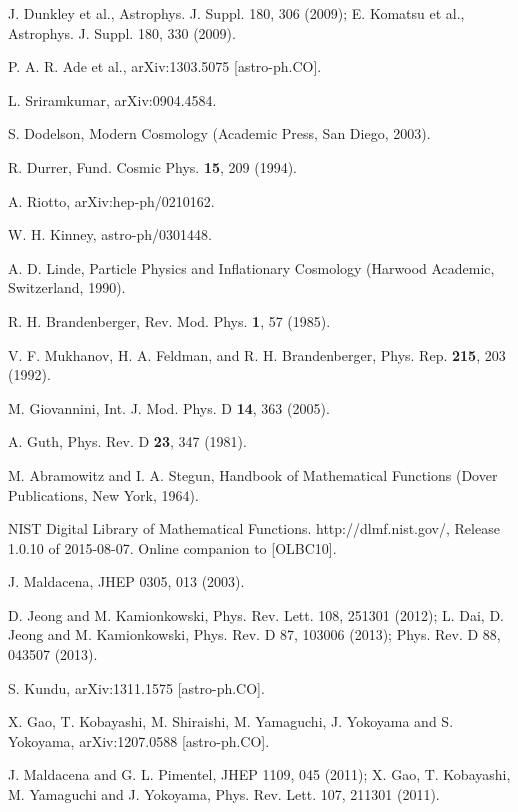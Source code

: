 \documentclass[12pt,a4paper,oneside]{book}
\begin{document}
\begin{thebibliography}{99}

J. Dunkley et al., Astrophys. J. Suppl. 180, 306 (2009); E. Komatsu et al., Astrophys. J. Suppl. 180, 330 (2009).

P. A. R. Ade et al., arXiv:1303.5075 [astro-ph.CO].

L. Sriramkumar, arXiv:0904.4584.

S. Dodelson, Modern Cosmology (Academic Press, San Diego, 2003).

R. Durrer, Fund. Cosmic Phys. {\bf 15}, 209 (1994).

A. Riotto, arXiv:hep-ph/0210162.

W. H. Kinney, astro-ph/0301448.

A. D. Linde, Particle Physics and Inflationary Cosmology 
(Harwood Academic, Switzerland, 1990).

R. H. Brandenberger, Rev. Mod. Phys. {\bf 1}, 57 (1985).

V. F. Mukhanov, H. A. Feldman, and R. H. Brandenberger, 
Phys. Rep. {\bf 215}, 203 (1992).

M. Giovannini, Int. J. Mod. Phys. D {\bf 14}, 363 (2005).

A. Guth, Phys. Rev. D {\bf 23}, 347 (1981).

M. Abramowitz and I. A. Stegun, Handbook of Mathematical 
Functions (Dover Publications, New York, 1964).

NIST Digital Library of Mathematical Functions. 
http://dlmf.nist.gov/, Release 1.0.10 of 2015-08-07. 
Online companion to [OLBC10].

J. Maldacena, JHEP 0305, 013 (2003).

D. Jeong and M. Kamionkowski, Phys. Rev. Lett. 108, 251301 (2012); L. Dai, D. Jeong
and M. Kamionkowski, Phys. Rev. D 87, 103006 (2013); Phys. Rev. D 88, 043507
(2013).

S. Kundu, arXiv:1311.1575 [astro-ph.CO].

X. Gao, T. Kobayashi, M. Shiraishi, M. Yamaguchi, J. Yokoyama and S. Yokoyama, arXiv:1207.0588 [astro-ph.CO].

J. Maldacena and G. L. Pimentel, JHEP 1109, 045 (2011); X. Gao, T. Kobayashi, M. Yamaguchi and J. Yokoyama, Phys. Rev. Lett. 107, 211301 (2011).


\end{thebibliography}
\end{document}
